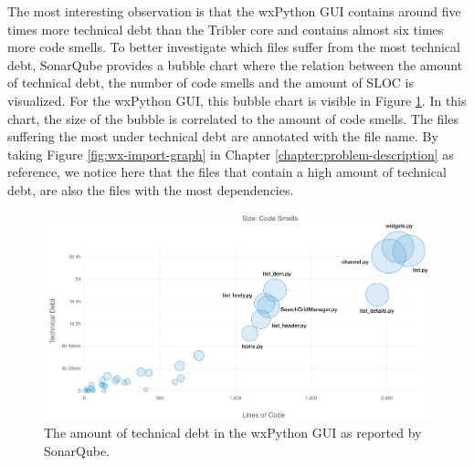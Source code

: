 \noindent The most interesting observation is that the wxPython GUI contains around five times more technical debt than the Tribler core and contains almost six times more code smells. To better investigate which files suffer from the most technical debt, SonarQube provides a bubble chart where the relation between the amount of technical debt, the number of code smells and the amount of SLOC is visualized. For the wxPython GUI, this bubble chart is visible in Figure \ref{fig:technical-debt-wx-gui}. In this chart, the size of the bubble is correlated to the amount of code smells. The files suffering the most under technical debt are annotated with the file name. By taking Figure \ref{fig:wx-import-graph} in Chapter \ref{chapter:problem-description} as reference, we notice here that the files that contain a high amount of technical debt, are also the files with the most dependencies.\\

\begin{figure}[h!]
	\centering
	\includegraphics[width=1.0\columnwidth]{images/improving_qa/technical_debt_wx_gui}
	\caption{The amount of technical debt in the wxPython GUI as reported by SonarQube.}
	\label{fig:technical-debt-wx-gui}
\end{figure}

